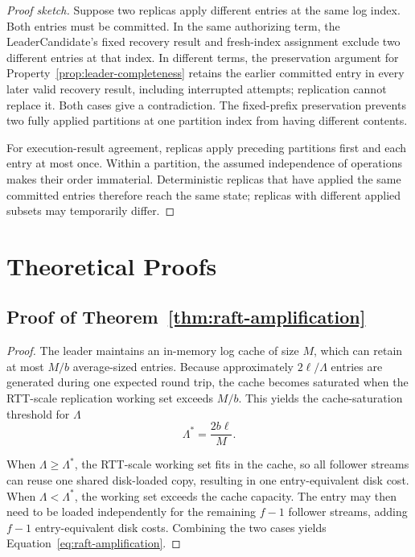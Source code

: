\begin{proof}[Proof sketch]
Suppose two replicas apply different entries at the same log index.
Both entries must be committed. In the same authorizing term, the
LeaderCandidate's fixed recovery result and fresh-index assignment exclude
two different entries at that index. In different terms, the preservation
argument for Property~\ref{prop:leader-completeness} retains
the earlier committed entry in every later valid recovery result,
including interrupted attempts; replication cannot replace it.
Both cases give a contradiction. The fixed-prefix preservation
prevents two fully applied partitions at one partition index from having
different contents.

For execution-result agreement, replicas apply preceding partitions first
and each entry at most once. Within a partition, the assumed independence
of operations makes their order immaterial. Deterministic replicas that
have applied the same committed entries therefore reach the same state;
replicas with different applied subsets may temporarily differ.
\end{proof}



\section{Theoretical Proofs}
\label{sec:appendix-proofs}
\subsection{Proof of Theorem~\ref{thm:raft-amplification}}
\begin{proof}
The leader maintains an in-memory log cache of size $M$, which can retain at
most $M/b$ average-sized entries.
Because approximately $2\ell/\Lambda$ entries are generated
during one expected round trip, the cache becomes saturated when the
RTT-scale replication working set exceeds $M/b$.
This yields the cache-saturation threshold for $\Lambda$
\[
\Lambda^*
=
\frac{2b\ell}{M}.
\]

When $\Lambda\geq\Lambda^*$, the RTT-scale working set fits in the cache, so
all follower streams can reuse one shared disk-loaded copy, resulting in one
entry-equivalent disk cost.
When $\Lambda<\Lambda^*$, the working set exceeds the cache capacity.
The entry may then need to be loaded independently for the remaining $f-1$
follower streams, adding $f-1$ entry-equivalent disk costs.
Combining the two cases yields
Equation~\ref{eq:raft-amplification}.
\end{proof}

